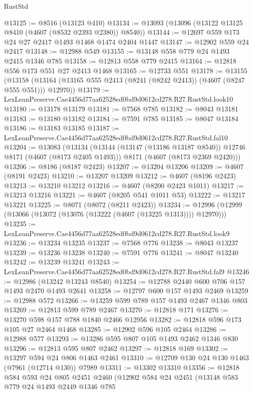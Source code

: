\begin{lexlean}{RustStd}
\begin{coremodule}
@13125 := @8516 (@13123 @410)
@13134 := @13093 (@13096 (@13122 @13125 @8410 (@4607 (@8532 @2393 @2380)) @8540))
@13144 := @12697 @559 @173 @24 @27 @2417 @1493 @1468 @1474 @2404 @1447
@13147 := @12902 @559 @24 @2417
@13148 := @12988 @549
@13155 := @13148 @558 @779 @24 @1493 @2415 @1346 @785
@13158 := @12813 @558 @779 @2415
@13164 := @12818 @556 @173 @551 @27 @2413 @1468
@13165 := @12733 @551
@13178 := @13155
    (@13158 (@13164 (@13165 @555 @2413 (@8241 (@8242 @2413)) (@4607 (@8247 @555 @551))) @12970))
@13179 := LexLeanPreserve.Cae4456d77aa62528ed0bd9d0612cd278.R27.RustStd.look10
@13180 := @13178 @13179
@13181 := @7568 @785
@13182 := @8043 @13181
@13183 := @13180 @13182
@13184 := @7591 @785
@13185 := @8047 @13184
@13186 := @13183 @13185
@13187 := LexLeanPreserve.Cae4456d77aa62528ed0bd9d0612cd278.R27.RustStd.fal10
@13204 := @13083
    (@13134
      (@13144 (@13147 (@13186 @13187 @8540)) @12746 @8171 (@4607 (@8173 @2405 @1493)))
      @8171
      (@4607 (@8173 @2369 @2420)))
@13206 := @8186 (@8187 @2423)
@13207 := @13204 @13206
@13209 := @4607 (@8191 @2423)
@13210 := @13207 @13209
@13212 := @4607 (@8196 @2423)
@13213 := @13210 @13212
@13216 := @4607 (@8200 @2423 @1011)
@13217 := @13213 @13216
@13221 := @4607 (@8205 @541 @1011 @53)
@13222 := @13217 @13221
@13225 := @8071 (@8072 (@8211 @2423))
@13234 := @12996 (@12999 (@13066 (@13072 (@13076 (@13222 (@4607 (@13225 @1313)))) @12970)))
@13235 := LexLeanPreserve.Cae4456d77aa62528ed0bd9d0612cd278.R27.RustStd.look9
@13236 := @13234 @13235
@13237 := @7568 @776
@13238 := @8043 @13237
@13239 := @13236 @13238
@13240 := @7591 @776
@13241 := @8047 @13240
@13242 := @13239 @13241
@13243 := LexLeanPreserve.Cae4456d77aa62528ed0bd9d0612cd278.R27.RustStd.fal9
@13246 := @12986 (@13242 @13243 @8540)
@13254 := @12788 @2440 @600 @706 @157 @1493 @2470 @1493 @2641
@13258 := @12797 @600 @157 @1493 @2469
@13259 := @12988 @572
@13266 := @13259 @599 @789 @157 @1493 @2467 @1346 @803
@13269 := @12813 @599 @789 @2467
@13270 := @12818 @171
@13276 := @13270 @598 @157 @788 @1840 @2466 @12956
@13282 := @12818 @596 @173 @105 @27 @2464 @1468
@13285 := @12902 @596 @105 @2464
@13286 := @12988 @577
@13293 := @13286 @595 @807 @105 @1493 @2462 @1346 @830
@13296 := @12813 @595 @807 @2462
@13297 := @12818 @169
@13302 := @13297 @594 @24 @806 @1463 @2461
@13310 := @12709 @130 @24 @130 @1463 (@7961 (@12714 @130)) @7989
@13311 := @13302 @13310
@13356 := @12818
    @584
    @593
    @24
    @805
    @2451
    @2460
    (@12902
      @584
      @24
      @2451
      (@13148
        @583
        @779
        @24
        @1493
        @2449
        @1346
        @785

\end{coremodule}
\end{lexlean}
